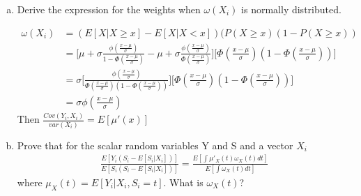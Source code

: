 \documentclass[11pt]{article}
\begin{document}
\begin{enumerate}[a)]
	\item Derive the expression for the weights when $\omega (X_i)$ is normally distributed.

	\begin{align*}
	\omega(X_i) &= ( E[X | X \geq x] - E[X | X < x] ) (P(X \geq x) ( 1 - P(X \geq x)) \\
	&=\bigg[ \mu + \sigma \frac{\phi (\frac{x - \mu}{\sigma})}{1 - \Phi( \frac{x - \mu}{\sigma})} - \mu + \sigma \frac{\phi (\frac{x - \mu}{\sigma})}{\Phi( \frac{x - \mu}{\sigma})} \bigg] \bigg[\Phi( \frac{x - \mu}{\sigma})(1- \Phi( \frac{x - \mu}{\sigma})) \bigg] \\
	&=\sigma \bigg[\frac{ \phi( \frac{x - \mu}{\sigma}) }{\Phi( \frac{x - \mu}{\sigma})(1- \Phi( \frac{x - \mu}{\sigma}))} \bigg] \bigg[\Phi( \frac{x - \mu}{\sigma})(1- \Phi( \frac{x - \mu}{\sigma}))\bigg] \\
	&=\sigma \phi( \frac{x - \mu}{\sigma})
	\end{align*}
	\medskip
	Then $\frac{Cov(Y_i, X_i)}{var(X_i)} = E[\mu ' (x)]$

	\item Prove that for the scalar random variables Y and S and a vector $X_i$ \\
	\begin{align*}
		\frac{E[Y_i(S_i - E[S_i|X_i])]}{E[S_i(S_i - E[S_i|X_i])]} = \frac{E [\int \mu'_X(t) 		\omega_X(t) dt]}{E[\int \omega_X(t) dt]}
		\end{align*}
	where $\mu_X(t) = E[Y_i|X_i, S_i=t]$. What is $\omega_X(t)$? \\


\end{enumerate}
\end{document}
